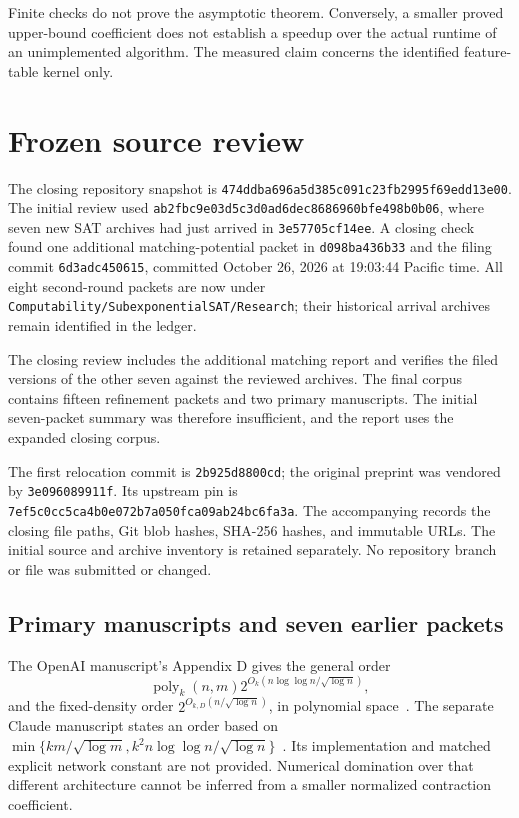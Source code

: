 \documentclass[11pt]{article}
\theoremstyle{definition}\newtheorem{definition}[theorem]{Definition}
\theoremstyle{remark}\newtheorem{remark}[theorem]{Remark}
\newcommand{\poly}{\operatorname{poly}}
\newcommand{\smallpath}[1]{{\small\path{#1}}}
\newcommand{\sourcepin}{\texttt{474ddba696a5d385c091c23fb2995f69edd13e00}}
\begin{document}
Finite checks do not prove the asymptotic theorem. Conversely, a smaller
proved upper-bound coefficient does not establish a speedup over the actual
runtime of an unimplemented algorithm. The measured claim concerns the
identified feature-table kernel only.

\section{Frozen source review}
\label{sec:review}

The closing repository snapshot is \sourcepin. The initial review used
\texttt{ab2fbc9e03d5c3d0ad6dec8686960bfe498b0b06}, where seven new SAT
archives had just arrived in \texttt{3e57705cf14ee}. A closing check found one
additional matching-potential packet in \texttt{d098ba436b33} and the filing
commit \texttt{6d3adc450615}, committed October 26, 2026 at 19:03:44 Pacific
time. All eight second-round packets are now under
\texttt{Computability/SubexponentialSAT/Research}; their historical arrival
archives remain identified in the ledger.

The closing review includes the additional matching report and verifies the
filed versions of the other seven against the reviewed archives. The final
corpus contains fifteen refinement packets and two primary manuscripts.
The initial seven-packet summary was therefore insufficient, and the report
uses the expanded closing corpus.

The first relocation commit is \texttt{2b925d8800cd}; the original preprint
was vendored by \texttt{3e096089911f}. Its upstream pin is
\texttt{7ef5c0cc5ca4b0e072b7a050fca09ab24bc6fa3a}. The accompanying
\smallpath{provenance/reviewed_sources.json} records the closing file paths,
Git blob hashes, SHA-256 hashes, and immutable URLs. The initial source and
archive inventory is retained separately. No repository branch or file was
submitted or changed.

\subsection{Primary manuscripts and seven earlier packets}

The OpenAI manuscript's Appendix D gives the general order
\begin{equation}
 \poly_k(n,m)2^{O_k(n\log\log n/\sqrt{\log n})},
 \label{eq:general-sat}
\end{equation}
and the fixed-density order $2^{O_{k,D}(n/\sqrt{\log n})}$, in polynomial
space~\cite{openai}. The separate Claude manuscript states an order based on
$\min\{km/\sqrt{\log m},k^2n\log\log n/\sqrt{\log n}\}$~\cite{claude}.
Its implementation and matched explicit network constant are not provided.
Numerical domination over that different architecture cannot be inferred
from a smaller normalized contraction coefficient.
\end{document}
